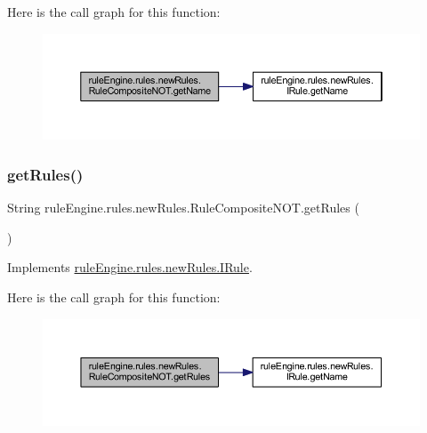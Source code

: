 Here is the call graph for this function\+:
\nopagebreak
\begin{figure}[H]
\begin{center}
\leavevmode
\includegraphics[width=350pt]{classrule_engine_1_1rules_1_1new_rules_1_1_rule_composite_n_o_t_a1d11d1d08a50f98b26109859ae453aaa_cgraph}
\end{center}
\end{figure}
\mbox{\label{classrule_engine_1_1rules_1_1new_rules_1_1_rule_composite_n_o_t_ac462ba010b03ab7af8dfa25705127945}} 
\subsubsection{\texorpdfstring{get\+Rules()}{getRules()}}
{\footnotesize\ttfamily String rule\+Engine.\+rules.\+new\+Rules.\+Rule\+Composite\+N\+O\+T.\+get\+Rules (\begin{DoxyParamCaption}{ }\end{DoxyParamCaption})\hspace{0.3cm}{\ttfamily [inline]}}



Implements \mbox{\hyperlink{interfacerule_engine_1_1rules_1_1new_rules_1_1_i_rule_a9d1c8d3f07b6ade794f60453449486c0}{rule\+Engine.\+rules.\+new\+Rules.\+I\+Rule}}.

Here is the call graph for this function\+:
\nopagebreak
\begin{figure}[H]
\begin{center}
\leavevmode
\includegraphics[width=350pt]{classrule_engine_1_1rules_1_1new_rules_1_1_rule_composite_n_o_t_ac462ba010b03ab7af8dfa25705127945_cgraph}
\end{center}
\end{figure}


